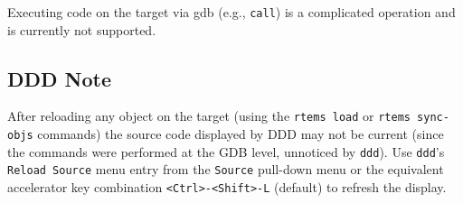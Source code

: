 \documentclass{article}
\newcommand{\cmd}[1]{{\tt #1}}
\begin{document}
Executing code on the target via gdb (e.g., \cmd{call}) is
a complicated operation and is currently not supported.

%
%

\subsection{DDD Note}
After reloading any object on the target (using the \cmd{rtems load} or
\cmd{rtems sync-objs} commands) the source code displayed
by DDD may not be current (since the commands were performed
at the GDB level, unnoticed by \cmd{ddd}).
Use \cmd{ddd}'s \cmd{Reload Source} menu entry from the
\cmd{Source} pull-down menu or the equivalent accelerator key combination
\verb|<Ctrl>-<Shift>-L| (default) to refresh the display.
\end{document}
